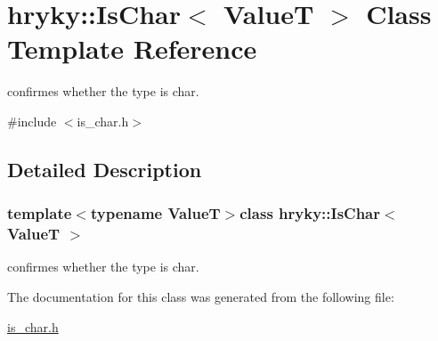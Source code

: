 \hypertarget{classhryky_1_1_is_char}{\section{hryky\-:\-:Is\-Char$<$ Value\-T $>$ Class Template Reference}
\label{classhryky_1_1_is_char}
}


confirmes whether the type is char.  




{\ttfamily \#include $<$is\-\_\-char.\-h$>$}



\subsection{Detailed Description}
\subsubsection*{template$<$typename Value\-T$>$class hryky\-::\-Is\-Char$<$ Value\-T $>$}

confirmes whether the type is char. 

The documentation for this class was generated from the following file\-:\begin{DoxyCompactItemize}
\item 
\hyperlink{is__char_8h}{is\-\_\-char.\-h}\end{DoxyCompactItemize}
